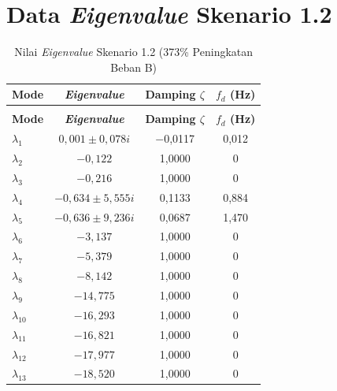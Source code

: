 \section{Data \textit{Eigenvalue} Skenario 1.2}
\begingroup
\fontsize{11}{13.2}\selectfont
\setlength{\tabcolsep}{7pt}
\begin{longtable}{>{\centering\arraybackslash}m{1.5cm} c c c} \caption[]{Nilai
	\textit{Eigenvalue} Skenario 1.2 (373\% Peningkatan Beban B)}
	\label{tab:eigenvalue_sk12_lampiran} \\
	\toprule
	\textbf{Mode} & \textbf{\textit{Eigenvalue}} & \textbf{Damping $\zeta$} &
	\textbf{$f_d$ (Hz)} \\
	\midrule
	\endfirsthead
	\multicolumn{4}{l}{\textit{(lanjutan)}} \\
	\toprule
	\textbf{Mode} & \textbf{\textit{Eigenvalue}} & \textbf{Damping $\zeta$} &
	\textbf{$f_d$ (Hz)} \\
	\midrule
	\endhead
	\bottomrule
	\endfoot
	$\lambda_1$  & $0{,}001 \pm 0{,}078i$            & $-$0,0117 & 0,012 \\
	$\lambda_2$  & $-0{,}122$                         & 1,0000 & 0 \\
	$\lambda_3$  & $-0{,}216$                         & 1,0000 & 0 \\
	$\lambda_4$  & $-0{,}634 \pm 5{,}555i$            & 0,1133 & 0,884 \\
	$\lambda_5$  & $-0{,}636 \pm 9{,}236i$            & 0,0687 & 1,470 \\
	$\lambda_6$  & $-3{,}137$                         & 1,0000 & 0 \\
	$\lambda_7$  & $-5{,}379$                         & 1,0000 & 0 \\
	$\lambda_8$  & $-8{,}142$                         & 1,0000 & 0 \\
	$\lambda_9$  & $-14{,}775$                        & 1,0000 & 0 \\
	$\lambda_{10}$ & $-16{,}293$                      & 1,0000 & 0 \\
	$\lambda_{11}$ & $-16{,}821$                      & 1,0000 & 0 \\
	$\lambda_{12}$ & $-17{,}977$                      & 1,0000 & 0 \\
	$\lambda_{13}$ & $-18{,}520$                      & 1,0000 & 0 \\
\end{longtable}
\par
\endgroup

